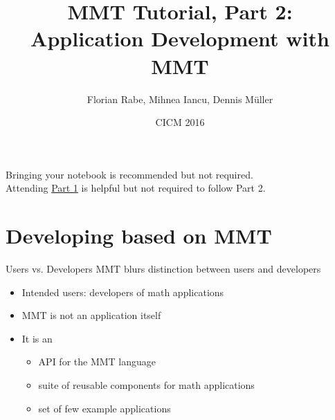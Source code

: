 \documentclass{beamer}
\begin{document}
\title{MMT Tutorial, Part 2: \\ Application Development with MMT}
\author{Florian Rabe, Mihnea Iancu, Dennis M\"uller}
\date{CICM 2016}
\begin{frame}
    \titlepage 
\begin{center}
Bringing your notebook is recommended but not required.\\
Attending \hyperref{http://www.cicm-conference.org/2016/slides/MMTLanguages.pdf}{}{}{Part 1} is helpful but not required to follow Part 2.
\end{center}
\end{frame}


\section{Developing based on MMT}

\begin{myframe}{Users vs. Developers}
MMT blurs distinction between users and developers
\begin{itemize}
 \item Intended users: developers of math applications
 \item MMT is not an application itself
 \item It is an
  \begin{itemize}
    \item API for the MMT language
    \item suite of reusable components for math applications
    \item set of few example applications
   \end{itemize}
\end{itemize}
\end{myframe}
\end{document}
